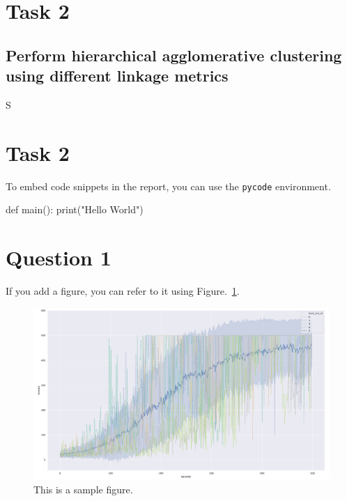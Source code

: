 \documentclass[12pt]{article}
\begin{document}
\section{Task 2}

\subsection{Perform hierarchical agglomerative clustering using different linkage metrics}

S
















\section{Task 2}
To embed code snippets in the report, you can use the \texttt{pycode} environment.

\begin{pycode}
def main():
    print("Hello World")
\end{pycode}

\section{Question 1}

If you add a figure, you can refer to it using Figure.~\ref*{fig:fig1}.

\begin{figure}[h] 
	\centering  %
    \includegraphics[width=0.3\columnwidth]{img/training.pdf}
	\caption{This is a sample figure.}
	\label{fig:fig1}
\end{figure}


\end{document}
